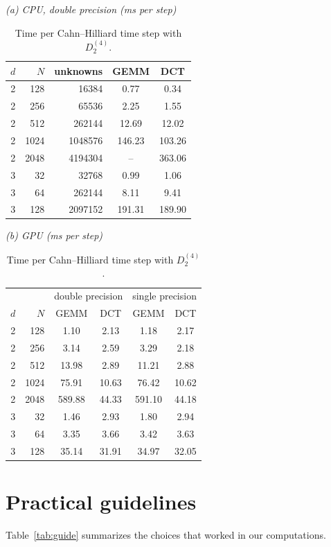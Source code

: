 \documentclass[smallextended,envcountsame]{svjour3}
\begin{document}
\begin{table}[t]\centering\footnotesize
\caption{Time per Cahn--Hilliard time step with $D_2^{(4)}$.}\label{tab:perf}
\textit{(a) CPU, double precision (ms per step)}\\[2pt]
\begin{tabular}{rr r cc}
\toprule
$d$ & $N$ & unknowns & GEMM & DCT\\
\midrule
2 & 128 & 16384 & 0.77 & 0.34\\
2 & 256 & 65536 & 2.25 & 1.55\\
2 & 512 & 262144 & 12.69 & 12.02\\
2 & 1024 & 1048576 & 146.23 & 103.26\\
2 & 2048 & 4194304 & -- & 363.06\\
3 & 32 & 32768 & 0.99 & 1.06\\
3 & 64 & 262144 & 8.11 & 9.41\\
3 & 128 & 2097152 & 191.31 & 189.90\\
\bottomrule
\end{tabular}

\medskip
\textit{(b) GPU (ms per step)}\\[2pt]
\begin{tabular}{rr cc cc}
\toprule
& & \multicolumn{2}{c}{double precision} & \multicolumn{2}{c}{single precision}\\
$d$ & $N$ & GEMM & DCT & GEMM & DCT\\
\midrule
2 & 128 & 1.10 & 2.13 & 1.18 & 2.17\\
2 & 256 & 3.14 & 2.59 & 3.29 & 2.18\\
2 & 512 & 13.98 & 2.89 & 11.21 & 2.88\\
2 & 1024 & 75.91 & 10.63 & 76.42 & 10.62\\
2 & 2048 & 589.88 & 44.33 & 591.10 & 44.18\\
3 & 32 & 1.46 & 2.93 & 1.80 & 2.94\\
3 & 64 & 3.35 & 3.66 & 3.42 & 3.63\\
3 & 128 & 35.14 & 31.91 & 34.97 & 32.05\\
\bottomrule
\end{tabular}
\end{table}

\section{Practical guidelines}\label{sec:guide}
Table~\ref{tab:guide} summarizes the choices that worked in our computations.
\end{document}
